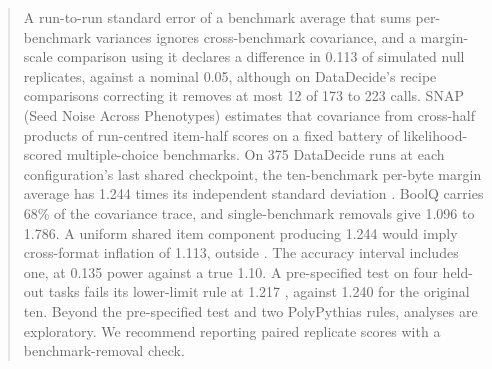 \begin{abstract}
A run-to-run standard error of a benchmark average that sums per-benchmark variances ignores cross-benchmark covariance, and a margin-scale comparison using it declares a difference in 0.113 of simulated null replicates, against a nominal 0.05, although on DataDecide's recipe comparisons correcting it removes at most 12 of 173 to 223 calls. SNAP (Seed Noise Across Phenotypes) estimates that covariance from cross-half products of run-centred item-half scores on a fixed battery of likelihood-scored multiple-choice benchmarks. On 375 DataDecide runs at each configuration's last shared checkpoint, the ten-benchmark per-byte margin average has 1.244 times its independent standard deviation . BoolQ carries 68\% of the covariance trace, and single-benchmark removals give 1.096 to 1.786. A uniform shared item component producing 1.244 would imply cross-format inflation of 1.113, outside . The accuracy interval  includes one, at 0.135 power against a true 1.10. A pre-specified test on four held-out tasks fails its lower-limit rule at 1.217 , against 1.240  for the original ten.  Beyond the pre-specified test and two PolyPythias rules, analyses are exploratory. We recommend reporting paired replicate scores with a benchmark-removal check.
\end{abstract}

